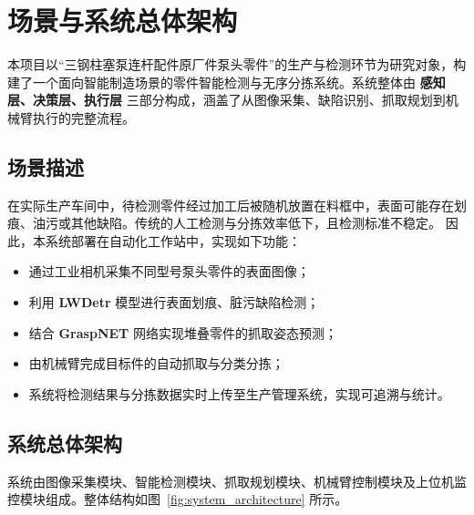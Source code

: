 \documentclass{cumcmthesis}
\begin{document}
\section{场景与系统总体架构}

本项目以“三钢柱塞泵连杆配件原厂件泵头零件”的生产与检测环节为研究对象，构建了一个面向智能制造场景的零件智能检测与无序分拣系统。系统整体由 \textbf{感知层、决策层、执行层} 三部分构成，涵盖了从图像采集、缺陷识别、抓取规划到机械臂执行的完整流程。

\subsection{场景描述}

在实际生产车间中，待检测零件经过加工后被随机放置在料框中，表面可能存在划痕、油污或其他缺陷。传统的人工检测与分拣效率低下，且检测标准不稳定。  
因此，本系统部署在自动化工作站中，实现如下功能：

\begin{itemize}
    \item 通过工业相机采集不同型号泵头零件的表面图像；
    \item 利用 \textbf{LWDetr} 模型进行表面划痕、脏污缺陷检测；
    \item 结合 \textbf{GraspNET} 网络实现堆叠零件的抓取姿态预测；
    \item 由机械臂完成目标件的自动抓取与分类分拣；
    \item 系统将检测结果与分拣数据实时上传至生产管理系统，实现可追溯与统计。
\end{itemize}

\subsection{系统总体架构}

系统由图像采集模块、智能检测模块、抓取规划模块、机械臂控制模块及上位机监控模块组成。整体结构如图~\ref{fig:system_architecture} 所示。
\end{document}
